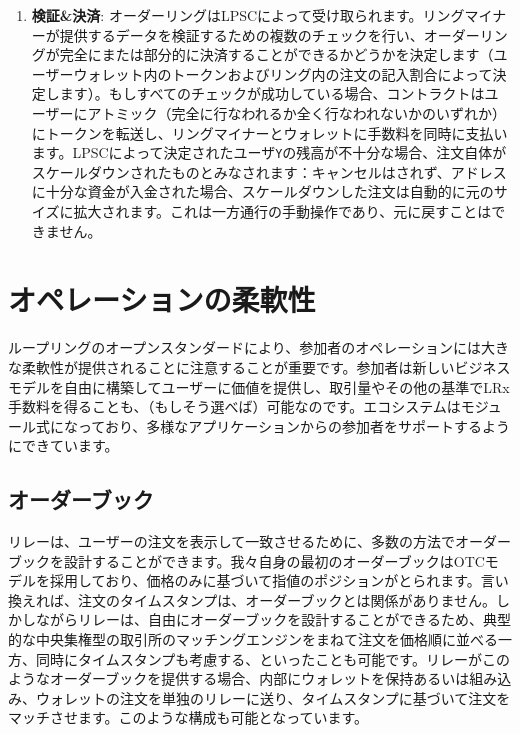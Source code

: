 \documentclass{article}
\makeatletter
\newenvironment{figurehere}
 {\def\@captype{figure}}
 {}
\makeatother
\begin{document}
\begin{multicols}{2}
\begin{enumerate}
\item \textbf{検証\&決済}: オーダーリングはLPSCによって受け取られます。リングマイナーが提供するデータを検証するための複数のチェックを行い、オーダーリングが完全にまたは部分的に決済することができるかどうかを決定します（ユーザーウォレット内のトークンおよびリング内の注文の記入割合によって決定します）。もしすべてのチェックが成功している場合、コントラクトはユーザーにアトミック（完全に行なわれるか全く行なわれないかのいずれか）にトークンを転送し、リングマイナーとウォレットに手数料を同時に支払います。LPSCによって決定されたユーザ\verb|Y|の残高が不十分な場合、注文自体がスケールダウンされたものとみなされます：キャンセルはされず、アドレスに十分な資金が入金された場合、スケールダウンした注文は自動的に元のサイズに拡大されます。これは一方通行の手動操作であり、元に戻すことはできません。


\end{enumerate}





%
%
%

\section{オペレーションの柔軟性\label{sec:business_model}}
ループリングのオープンスタンダードにより、参加者のオペレーションには大きな柔軟性が提供されることに注意することが重要です。参加者は新しいビジネスモデルを自由に構築してユーザーに価値を提供し、取引量やその他の基準でLRx手数料を得ることも、（もしそう選べば）可能なのです。エコシステムはモジュール式になっており、多様なアプリケーションからの参加者をサポートするようにできています。


\subsection{オーダーブック\label{sec:order_book}}
リレーは、ユーザーの注文を表示して一致させるために、多数の方法でオーダーブックを設計することができます。我々自身の最初のオーダーブックはOTCモデルを採用しており、価格のみに基づいて指値のポジションがとられます。言い換えれば、注文のタイムスタンプは、オーダーブックとは関係がありません。しかしながらリレーは、自由にオーダーブックを設計することができるため、典型的な中央集権型の取引所のマッチングエンジンをまねて注文を価格順に並べる一方、同時にタイムスタンプも考慮する、といったことも可能です。リレーがこのようなオーダーブックを提供する場合、内部にウォレットを保持あるいは組み込み、ウォレットの注文を単独のリレーに送り、タイムスタンプに基づいて注文をマッチさせます。このような構成も可能となっています。



\end{multicols}
\end{document}
